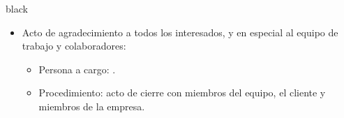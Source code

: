 \documentclass[11pt]{charter}
\begin{document}
\begin{consigna}{black}
\begin{itemize}
 
\item Acto de agradecimiento a todos los interesados, y en especial al equipo de trabajo y colaboradores:
  
 \begin{itemize}
 \item Persona a cargo: \authorname. 
 \end{itemize}
 
 \begin{itemize}
 \item Procedimiento: acto de cierre con miembros del equipo, el cliente y miembros de la empresa. 
 
 
 
\end{itemize}

\end{itemize}

\end{consigna}
\end{document}
